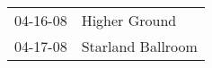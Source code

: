 \begin{supertabular}{p{0.07\textwidth}p{0.23\textwidth}}
 04-16-08 &      Higher Ground \\
 04-17-08 &  Starland Ballroom \\
\end{supertabular}
